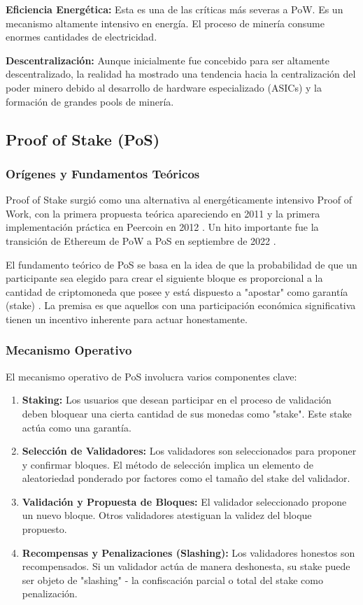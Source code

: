 \documentclass[spanish,12pt,letterpaper]{report}
\begin{document}
\textbf{Eficiencia Energética:} Esta es una de las críticas más severas a PoW. Es un mecanismo altamente intensivo en energía. El proceso de minería consume enormes cantidades de electricidad.

\textbf{Descentralización:} Aunque inicialmente fue concebido para ser altamente descentralizado, la realidad ha mostrado una tendencia hacia la centralización del poder minero debido al desarrollo de hardware especializado (ASICs) y la formación de grandes pools de minería.

\subsection{Proof of Stake (PoS)}

\subsubsection{Orígenes y Fundamentos Teóricos}

Proof of Stake surgió como una alternativa al energéticamente intensivo Proof of Work, con la primera propuesta teórica apareciendo en 2011 y la primera implementación práctica en Peercoin en 2012 \parencite{itm2025pos}. Un hito importante fue la transición de Ethereum de PoW a PoS en septiembre de 2022 \parencite{ethereum2022merge}.

El fundamento teórico de PoS se basa en la idea de que la probabilidad de que un participante sea elegido para crear el siguiente bloque es proporcional a la cantidad de criptomoneda que posee y está dispuesto a "apostar" como garantía (stake) \parencite{investopedia2024pos}. La premisa es que aquellos con una participación económica significativa tienen un incentivo inherente para actuar honestamente.

\subsubsection{Mecanismo Operativo}

El mecanismo operativo de PoS involucra varios componentes clave:

\begin{enumerate}
    \item \textbf{Staking:} Los usuarios que desean participar en el proceso de validación deben bloquear una cierta cantidad de sus monedas como "stake". Este stake actúa como una garantía.
    \item \textbf{Selección de Validadores:} Los validadores son seleccionados para proponer y confirmar bloques. El método de selección implica un elemento de aleatoriedad ponderado por factores como el tamaño del stake del validador.
    \item \textbf{Validación y Propuesta de Bloques:} El validador seleccionado propone un nuevo bloque. Otros validadores atestiguan la validez del bloque propuesto.
    \item \textbf{Recompensas y Penalizaciones (Slashing):} Los validadores honestos son recompensados. Si un validador actúa de manera deshonesta, su stake puede ser objeto de "slashing" - la confiscación parcial o total del stake como penalización.
\end{enumerate}
\end{document}
